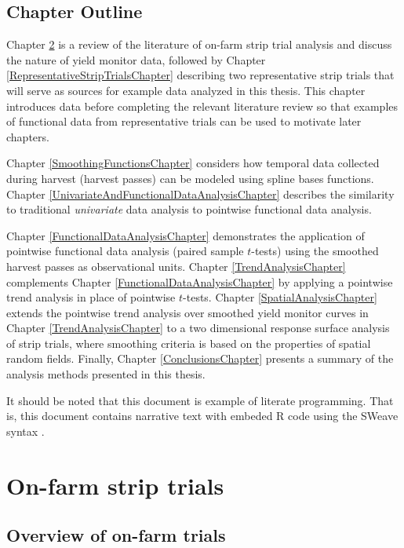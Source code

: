 \documentclass[phdcss]{SDSUThesis}
\begin{document}
\section{Chapter Outline}

Chapter \ref{ChapOnFarmStripTrials} is a review of the literature of on-farm strip trial analysis and discuss the nature of yield monitor data, followed by Chapter \ref{RepresentativeStripTrialsChapter} describing two representative strip trials that will serve as sources for example data analyzed in this thesis. This chapter introduces data before completing the relevant literature review so that examples of functional data from representative trials can be used to motivate later chapters.

Chapter \ref{SmoothingFunctionsChapter} considers how temporal data collected during harvest (harvest passes) can be modeled using spline bases functions. Chapter \ref{UnivariateAndFunctionalDataAnalysisChapter} describes the similarity to traditional \textit{univariate} data analysis to pointwise functional data analysis.

Chapter \ref{FunctionalDataAnalysisChapter} demonstrates the application of pointwise functional data analysis (paired sample $t$-tests) using the smoothed harvest passes as observational units. Chapter \ref{TrendAnalysisChapter} complements Chapter \ref{FunctionalDataAnalysisChapter} by applying a pointwise trend analysis in place of pointwise $t$-tests. Chapter \ref{SpatialAnalysisChapter} extends the pointwise trend analysis over smoothed yield monitor curves in Chapter \ref{TrendAnalysisChapter} to a two dimensional response surface analysis of strip trials, where smoothing criteria is based on the properties of spatial random fields. Finally, Chapter \ref{ConclusionsChapter} presents a summary of the analysis methods presented in this thesis.

It should be noted that this document is example of literate programming. That is, this document contains narrative text with embeded R code using the SWeave syntax \cite{leisch-12-2002}.

\clearpage

\chapter{On-farm strip trials}\label{ChapOnFarmStripTrials}

\section{Overview of on-farm trials}
\end{document}
